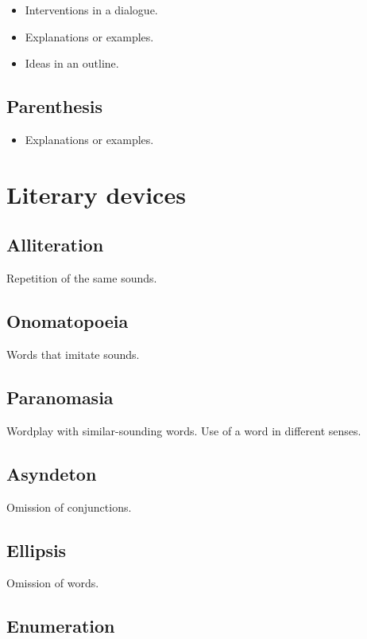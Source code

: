 \documentclass{article}
\begin{document}
\begin{itemize}
    \item Interventions in a dialogue.
    \item Explanations or examples.
    \item Ideas in an outline.
\end{itemize}

\subsection*{Parenthesis}

\begin{itemize}
    \item Explanations or examples.
\end{itemize}

\section*{Literary devices}

\subsection*{Alliteration}

Repetition of the same sounds.

\subsection*{Onomatopoeia}

Words that imitate sounds.

\subsection*{Paranomasia}

Wordplay with similar-sounding words.
Use of a word in different senses.

\subsection*{Asyndeton}

Omission of conjunctions.

\subsection*{Ellipsis}

Omission of words.

\subsection*{Enumeration}
\end{document}

